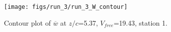 \begin{figure}[H]
\centering
\texttt{[image: figs/run\_3/run\_3\_W\_contour]}
\caption{Contour plot of $\overline{w}$ at $z/c$=5.37, $V_{free}$=19.43, station 1.}
\label{fig:run_3_W_contour}
\end{figure}



